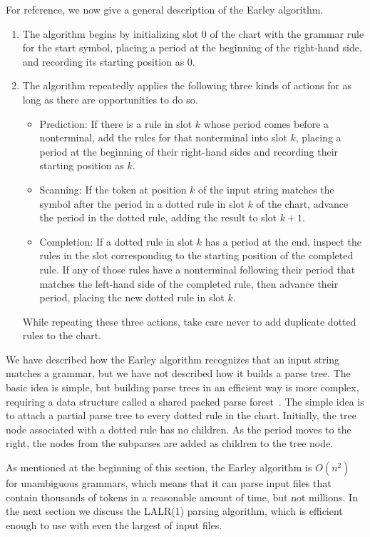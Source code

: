 \documentclass[7x10]{TimesAPriori_MIT}%
\numberwithin{theorem}{chapter}
\numberwithin{definition}{chapter}
\numberwithin{equation}{chapter}
\begin{document}
{For reference, we now give a general description of the Earley
algorithm.
\begin{enumerate}
\item The algorithm begins by initializing slot $0$ of the chart with the
  grammar rule for the start symbol, placing a period at the beginning
  of the right-hand side, and recording its starting position as $0$.
  
\item The algorithm repeatedly applies the following three kinds of
  actions for as long as there are opportunities to do so.
  \begin{itemize}
  \item Prediction: If there is a rule in slot $k$ whose period comes
    before a nonterminal, add the rules for that nonterminal into slot
    $k$, placing a period at the beginning of their right-hand sides
    and recording their starting position as $k$.
  \item Scanning: If the token at position $k$ of the input string
    matches the symbol after the period in a dotted rule in slot $k$
    of the chart, advance the period in the dotted rule, adding
    the result to slot $k+1$.
  \item Completion: If a dotted rule in slot $k$ has a period at the
    end, inspect the rules in the slot corresponding to the starting
    position of the completed rule. If any of those rules have a
    nonterminal following their period that matches the left-hand side
    of the completed rule, then advance their period, placing the new
    dotted rule in slot $k$.
  \end{itemize}
  While repeating these three actions, take care never to add
  duplicate dotted rules to the chart.
\end{enumerate}

We have described how the Earley algorithm recognizes that an input
string matches a grammar, but we have not described how it builds a
parse tree. The basic idea is simple, but building parse trees in an
efficient way is more complex, requiring a data structure called a
shared packed parse forest~\citep{Tomita:1985qr}.  The simple idea is
to attach a partial parse tree to every dotted rule in the chart.
Initially, the tree node associated with a dotted rule has no
children. As the period moves to the right, the nodes from the
subparses are added as children to the tree node.

As mentioned at the beginning of this section, the Earley algorithm is
$O(n^2)$ for unambiguous grammars, which means that it can parse input
files that contain thousands of tokens in a reasonable amount of time,
but not millions.
%
In the next section we discuss the LALR(1) parsing algorithm, which is
efficient enough to use with even the largest of input files.


}
\end{document}
